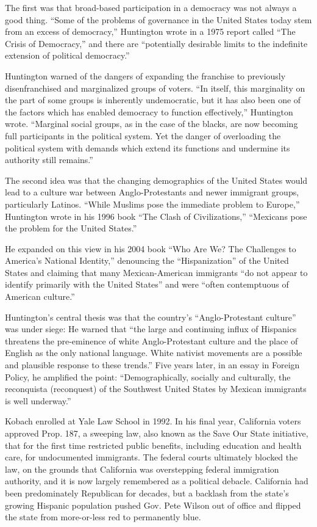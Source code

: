 The first was that broad-based participation in a democracy was not
always a good thing. ``Some of the problems of governance in the United
States today stem from an excess of democracy,'' Huntington wrote in a
1975 report called ``The Crisis of Democracy,'' and there are
``potentially desirable limits to the indefinite extension of political
democracy.''

Huntington warned of the dangers of expanding the franchise to
previously disenfranchised and marginalized groups of voters. ``In
itself, this marginality on the part of some groups is inherently
undemocratic, but it has also been one of the factors which has enabled
democracy to function effectively,'' Huntington wrote. ``Marginal social
groups, as in the case of the blacks, are now becoming full participants
in the political system. Yet the danger of overloading the political
system with demands which extend its functions and undermine its
authority still remains.''

The second idea was that the changing demographics of the United States
would lead to a culture war between Anglo-Protestants and newer
immigrant groups, particularly Latinos. ``While Muslims pose the
immediate problem to Europe,'' Huntington wrote in his 1996 book ``The
Clash of Civilizations,'' ``Mexicans pose the problem for the United
States.''

He expanded on this view in his 2004 book ``Who Are We? The Challenges
to America's National Identity,'' denouncing the ``Hispanization'' of
the United States and claiming that many Mexican-American immigrants
``do not appear to identify primarily with the United States'' and were
``often contemptuous of American culture.''

Huntington's central thesis was that the country's ``Anglo-Protestant
culture'' was under siege: He warned that ``the large and continuing
influx of Hispanics threatens the pre-eminence of white Anglo-Protestant
culture and the place of English as the only national language. White
nativist movements are a possible and plausible response to these
trends.'' Five years later, in an essay in Foreign Policy, he amplified
the point: ``Demographically, socially and culturally, the reconquista
(reconquest) of the Southwest United States by Mexican immigrants is
well underway.''

Kobach enrolled at Yale Law School in 1992. In his final year,
California voters approved Prop. 187, a sweeping law, also known as the
Save Our State initiative, that for the first time restricted public
benefits, including education and health care, for undocumented
immigrants. The federal courts ultimately blocked the law, on the
grounds that California was overstepping federal immigration authority,
and it is now largely remembered as a political debacle. California had
been predominately Republican for decades, but a backlash from the
state's growing Hispanic population pushed Gov. Pete Wilson out of
office and flipped the state from more-or-less red to permanently blue.

